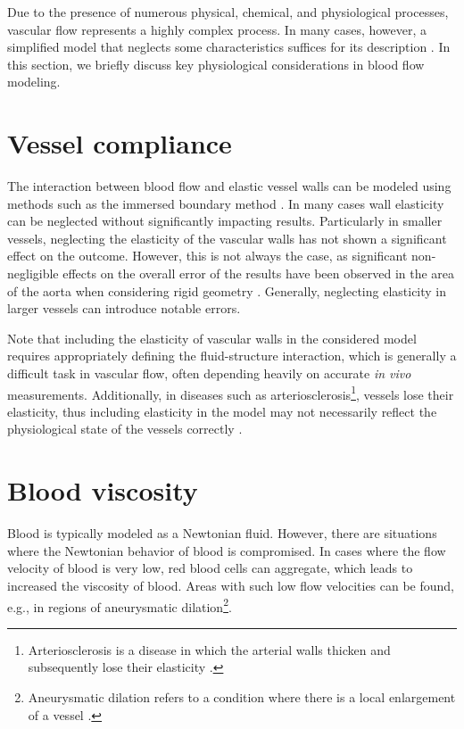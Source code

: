Due to the presence of numerous physical, chemical, and physiological processes, vascular flow represents a highly complex process. In many cases, however, a simplified model that neglects some characteristics suffices for its description \cite{Saloner2019}. In this section, we briefly discuss key physiological considerations in blood flow modeling.

\section*{\fontsize{11}{15}\selectfont Vessel compliance}
The interaction between blood flow and elastic vessel walls can be modeled using methods such as the immersed boundary method \cite{Peskin}. In many cases wall elasticity can be neglected without significantly impacting results. Particularly in smaller vessels, neglecting the elasticity of the vascular walls has not shown a significant effect on the outcome. \cite{DempereMarco2006} However, this is not always the case, as significant non-negligible effects on the overall error of the results have been observed in the area of the aorta when considering rigid geometry \cite{LANTZ2011}. Generally, neglecting elasticity in larger vessels can introduce notable errors.

Note that including the elasticity of vascular walls in the considered model requires appropriately defining the  fluid-structure interaction, which is generally a difficult task in vascular flow, often depending heavily on accurate \textit{in vivo} measurements. Additionally, in diseases such as arteriosclerosis\footnote{Arteriosclerosis is a disease in which the arterial walls thicken and subsequently lose their elasticity \cite{Fishbein2015}.}, vessels lose their elasticity, thus including elasticity in the model may not necessarily reflect the physiological state of the vessels correctly \cite{Saloner2019}.

\section*{\fontsize{11}{15}\selectfont Blood viscosity}
Blood is typically modeled as a Newtonian fluid. However, there are situations where the Newtonian behavior of blood is compromised. In cases where the flow velocity of blood is very low, red blood cells can aggregate, which leads to increased the viscosity of blood. Areas with such low flow velocities can be found, e.g., in regions of aneurysmatic dilation\footnote{Aneurysmatic dilation refers to a condition where there is a local enlargement of a vessel \cite{Syed1997}.}.

